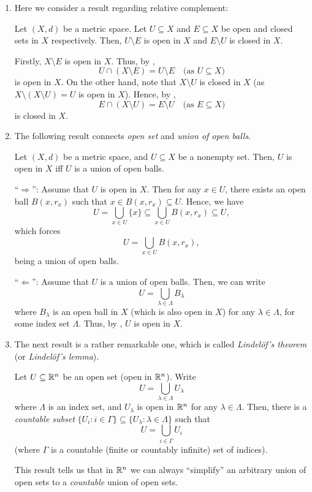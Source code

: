 \begin{enumerate}
\item Here we consider a result regarding relative complement:
\begin{proposition}
\label{prp:open-closed-comple}
Let \((X,d)\) be a metric space.  Let \(U\subseteq X\) and \(E\subseteq X\) be
open and closed sets in \(X\) respectively. Then, \(U\setminus E\) is open in
\(X\) and \(E\setminus U\) is closed in \(X\).
\end{proposition}
\begin{pf}
Firstly, \(X\setminus E\) is open in \(X\). Thus, by
,
\[
U\cap (X\setminus E)=U\setminus E\quad\text{(as \(U\subseteq X\))}
\]
is open in \(X\). On the other hand, note that \(X\setminus U\) is closed in
\(X\) (as \(X\setminus (X\setminus U)=U\) is open in \(X\)). Hence, by
,
\[
E\cap (X\setminus U)=E\setminus U\quad\text{(as \(E\subseteq X\))}
\]
is closed in \(X\).
\end{pf}
\item The following result connects \emph{open set} and \emph{union of open
balls}.
\begin{proposition}
\label{prp:open-set-union-open-balls}
Let \((X,d)\) be a metric space, and \(U\subseteq X\) be a nonempty set. Then,
\(U\) is open in \(X\) iff \(U\) is a union of open balls.
\end{proposition}
\begin{pf}
``\(\Rightarrow\)'': Assume that \(U\) is open in \(X\). Then for any \(x\in
U\), there exists an open ball \(B(x,r_x)\) such that \(x\in B(x,r_x)\subseteq
U\). Hence, we have
\[
U=\bigcup_{x\in U}\{x\}\subseteq \bigcup_{x\in U}B(x,r_x)\subseteq U,
\]
which forces 
\[
U=\bigcup_{x\in U}B(x,r_x),
\]
being a union of open balls.

``\(\Leftarrow\)'': Assume that \(U\) is a union of open balls. Then, we can
write
\[
U=\bigcup_{\lambda\in \Lambda}B_{\lambda}
\]
where \(B_{\lambda}\) is an open ball in \(X\) (which is also open in \(X\))
for any \(\lambda\in\Lambda\), for some index set \(\Lambda\). Thus, by
, \(U\) is open in \(X\).
\end{pf}

\item The next result is a rather remarkable one, which is called
\emph{Lindel\"{o}f's theorem} (or \emph{Lindel\"{o}f's lemma}).
\begin{theorem}
\label{thm:lindelof}
Let \(U\subseteq \mathbb{R}^n\) be an open set (open in \(\mathbb{R}^n\)). Write
\[
U=\bigcup_{\lambda\in\Lambda}U_{\lambda}
\]
where \(\Lambda\) is an index set, and \(U_\lambda\) is open in \(\mathbb{R}^n\) for
any \(\lambda\in\Lambda\).  Then, there is a \emph{countable subset}
\(\{U_i:i\in\Gamma\}\subseteq \{U_{\lambda}:\lambda\in\Lambda\}\) such that
\[
U=\bigcup_{i\in\Gamma}U_{i}
\]
(where \(\Gamma\) is a countable (finite or countably infinite) set of
indices).
\end{theorem}
\begin{intuition}
This result tells us that in \(\mathbb{R}^n\) we can always ``simplify'' an arbitrary
union of open sets to a \emph{countable} union of open sets.
\end{intuition}


\end{enumerate}
